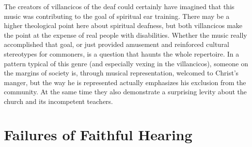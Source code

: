 The creators of villancicos of the deaf could certainly have imagined that this music was contributing to the goal of spiritual ear training.
There may be a higher theological point here about spiritual deafness, but both  villancicos make the point at the expense of real people with disabilities.
Whether the music really accomplished that goal, or just provided amusement and reinforced cultural stereotypes for commoners, is a question that haunts the whole repertoire.
In a pattern typical of this genre (and especially vexing in the  villancicos), someone on the margins of society is, through musical representation, welcomed to Christ's manger, but the way he is represented actually emphasizes his exclusion from the community.
At the same time they also demonstrate a surprising levity about the church and its incompetent teachers.


\section{Failures of Faithful Hearing}

